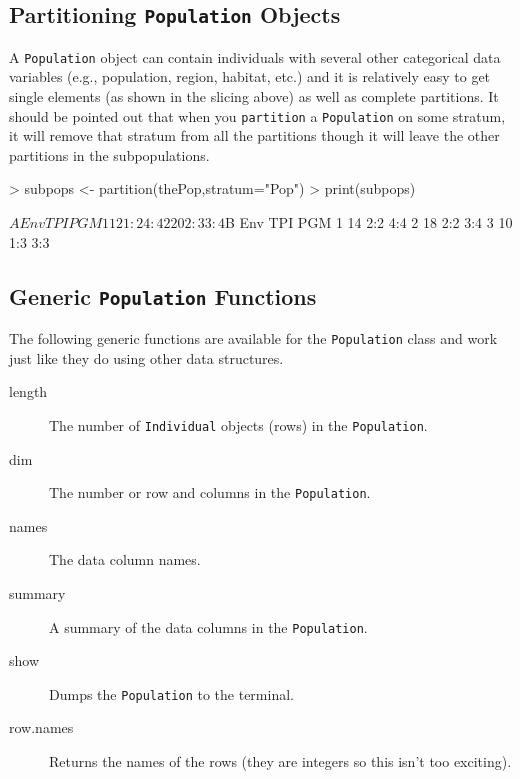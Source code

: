 \documentclass[letterpaper,twoside,openany]{book}
\begin{document}
\subsection{Partitioning \texttt{Population} Objects}

A \texttt{Population} object can contain individuals with several other categorical data variables (e.g., population, region, habitat, etc.) and it is relatively easy to get single elements (as shown in the slicing above) as well as complete partitions.  It should be pointed out that when you \texttt{partition} a \texttt{Population} on some stratum, it will remove that stratum from all the partitions though it will leave the other partitions in the subpopulations.

\begin{Schunk}
\begin{Sinput}
> subpops <- partition(thePop,stratum="Pop")
> print(subpops)
\end{Sinput}
\begin{Soutput}
$A
  Env TPI PGM
1  12 1:2 4:4
2  20 2:3 3:4

$B
  Env TPI PGM
1  14 2:2 4:4
2  18 2:2 3:4
3  10 1:3 3:3
\end{Soutput}
\end{Schunk}


\subsection{Generic \texttt{Population} Functions}

The following generic functions are available for the \texttt{Population} class and work just like they do using other data structures.

\begin{description}
	\item[length] The number of \texttt{Individual} objects (rows) in the \texttt{Population}.
	\item[dim] The number or row and columns in the \texttt{Population}.
	\item[names] The data column names.
	\item[summary] A summary of the data columns in the \texttt{Population}.
	\item[show] Dumps the \texttt{Population} to the terminal.
	\item[row.names] Returns the names of the rows (they are integers so this isn't too exciting).
\end{description}
\end{document}
